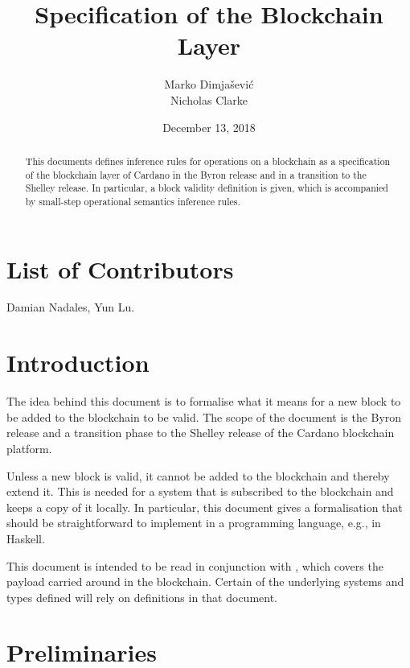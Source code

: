 \documentclass[11pt,a4paper]{article}
\begin{document}
\title{Specification of the Blockchain Layer}

\author{Marko Dimjašević \\ Nicholas Clarke}

\date{December 13, 2018}

\maketitle

\begin{abstract}
  This documents defines inference rules for operations on a blockchain as a
  specification of the blockchain layer of Cardano in the Byron release and in
  a transition to the Shelley release.
  In particular, a block validity definition is given, which is accompanied by
  small-step operational semantics inference rules.
\end{abstract}

\section*{List of Contributors}
\label{acknowledgements}

Damian Nadales, Yun Lu.

\tableofcontents
\listoffigures

\section{Introduction}
\label{sec:introduction}

The idea behind this document is to formalise what it means for a new block to
be added to the blockchain to be valid.
%
The scope of the document is the Byron release and a transition phase to the
Shelley release of the Cardano blockchain platform.


Unless a new block is valid, it cannot be added to the blockchain and thereby
extend it.
%
This is needed for a system that is subscribed to the blockchain and keeps a
copy of it locally.
%
In particular, this document gives a formalisation that should be
straightforward to implement in a programming language, e.g., in Haskell.

This document is intended to be read in conjunction with \cite{byron_ledger_spec},
which covers the payload carried around in the blockchain. Certain of the
underlying systems and types defined will rely on definitions in that document.

\section{Preliminaries}
\label{sec:preliminaries}
\end{document}
